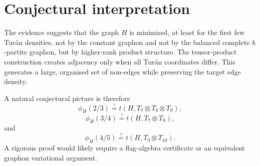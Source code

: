 \documentclass[11pt]{article}
\begin{document}
\section{Conjectural interpretation}

The evidence suggests that the graph $H$ is minimised, at least for the first few Tur\'an densities, not by the constant graphon and not by the balanced complete $k$-partite graphon, but by higher-rank product structure. The tensor-product construction creates adjacency only when all Tur\'an coordinates differ. This generates a large, organised set of non-edges while preserving the target edge density.

A natural conjectural picture is therefore
\[
\phi_H(2/3)
\stackrel{?}{=}
t(H,T_7\otimes T_8\otimes T_9),
\]
\[
\phi_H(3/4)
\stackrel{?}{=}
t(H,T_7\otimes T_8),
\]
and
\[
\phi_H(4/5)
\stackrel{?}{=}
t(H,T_9\otimes T_{10}).
\]
A rigorous proof would likely require a flag-algebra certificate or an equivalent graphon variational argument.
\end{document}
